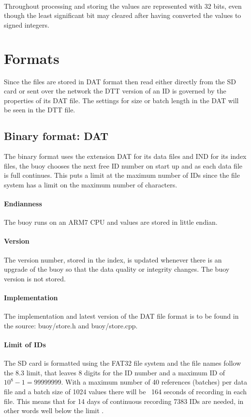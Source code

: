 \documentclass[a4paper]{article}
\begin{document}
\begin{multicols}{2}
    \paragraph{} Throughout processing and storing the values are
    represented with 32 bits, even though the least significant bit may
    cleared after having converted the values to signed integers.

  \section{Formats}
  Since the files are stored in DAT format then read either directly
  from the SD card or sent over the network the DTT version of an ID is
  governed by the properties of its DAT file. The settings for size or
  batch length in the DAT will be seen in the DTT file.

  \subsection{Binary format: DAT}
  The binary format uses the extension DAT for its data files and IND
  for its index files, the buoy chooses the next free ID number on start
  up and as each data file is full continues. This puts a limit at the
  maximum number of IDs since the file system has a limit on the maximum
  number of characters.

  \paragraph{Endianness} The buoy runs on an ARM7 CPU and values are
  stored in little endian.

  \paragraph{Version} The version number, stored in the index,
  is updated whenever there is an upgrade of the buoy so that the
  data quality or integrity changes. The buoy version is not stored.

  \paragraph{Implementation}
  The implementation and latest version of the DAT file format is to be
  found in the source: buoy/store.h and buoy/store.cpp.

  \paragraph{Limit of IDs}
  The SD card is formatted using the FAT32 file system and the file
  names follow the 8.3 limit, that leaves 8 digits for the ID number and
  a maximum ID of $10^8 - 1 = 99999999$. With a maximum number of 40 references
  (batches) per data file and a batch size of 1024 values there will be
  ~164 seconds of recording in each file. This means that for 14 days of
  continuous recording 7383 IDs are needed, in other words well below
  the limit \cite{local_data_capacity_budget}.


\end{multicols}
\end{document}

